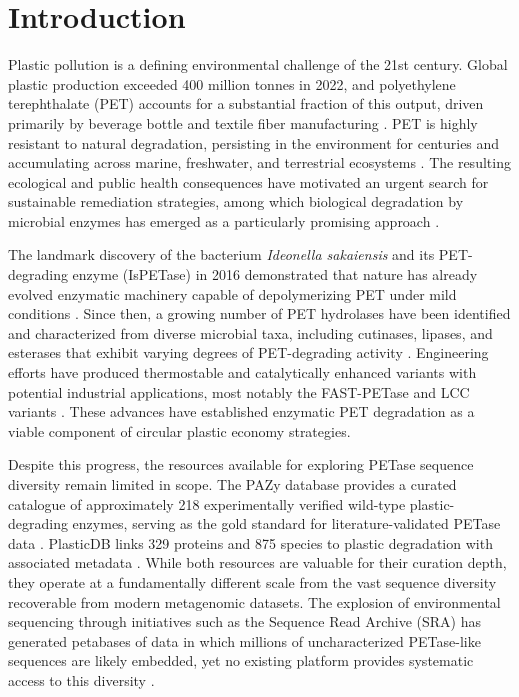 \documentclass[unnumsec,webpdf,modern,large]{oup-authoring-template}
\begin{document}
\section{Introduction}

Plastic pollution is a defining environmental challenge of the 21st century. Global plastic production exceeded 400 million tonnes in 2022, and polyethylene terephthalate (PET) accounts for a substantial fraction of this output, driven primarily by beverage bottle and textile fiber manufacturing \citep{geyer_production_2017,noauthor_plastics_nodate}. PET is highly resistant to natural degradation, persisting in the environment for centuries and accumulating across marine, freshwater, and terrestrial ecosystems \citep{chamas_degradation_2020}. The resulting ecological and public health consequences have motivated an urgent search for sustainable remediation strategies, among which biological degradation by microbial enzymes has emerged as a particularly promising approach \citep{wei_microbial_2017,tournier_engineered_2020}.

The landmark discovery of the bacterium \textit{Ideonella sakaiensis} and its PET-degrading enzyme (IsPETase) in 2016 demonstrated that nature has already evolved enzymatic machinery capable of depolymerizing PET under mild conditions \citep{yoshida_bacterium_2016}. Since then, a growing number of PET hydrolases have been identified and characterized from diverse microbial taxa, including cutinases, lipases, and esterases that exhibit varying degrees of PET-degrading activity \citep{danso_plastics_2019,kawai_current_2019}. Engineering efforts have produced thermostable and catalytically enhanced variants with potential industrial applications, most notably the FAST-PETase and LCC variants \citep{lu_machine_2022,tournier_engineered_2020}. These advances have established enzymatic PET degradation as a viable component of circular plastic economy strategies.

Despite this progress, the resources available for exploring PETase sequence diversity remain limited in scope. The PAZy database provides a curated catalogue of approximately 218 experimentally verified wild-type plastic-degrading enzymes, serving as the gold standard for literature-validated PETase data \citep{buchholz_plastics_2022}. PlasticDB links 329 proteins and 875 species to plastic degradation with associated metadata \citep{gambarini_plasticdb_2022}. While both resources are valuable for their curation depth, they operate at a fundamentally different scale from the vast sequence diversity recoverable from modern metagenomic datasets. The explosion of environmental sequencing through initiatives such as the Sequence Read Archive (SRA) has generated petabases of data in which millions of uncharacterized PETase-like sequences are likely embedded, yet no existing platform provides systematic access to this diversity \citep{leinonen_sequence_2011}.
\end{document}
